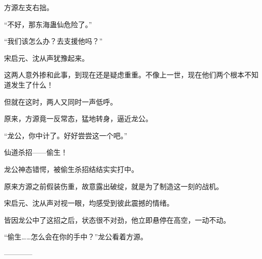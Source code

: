 \begin{this_body}
方源左支右拙。

“不好，那东海蛊仙危险了。”

“我们该怎么办？去支援他吗？”

宋启元、沈从声犹豫起来。

这两人意外掺和此事，到现在还是疑虑重重。不像上一世，现在他们两个根本不知道发生了什么！

但就在这时，两人又同时一声低呼。

原来，方源竟一反常态，猛地转身，逼近龙公。

“龙公，你中计了。好好尝尝这一个吧。”

仙道杀招——偷生！

龙公神态错愕，被偷生杀招结结实实打中。

原来方源之前假装伤重，故意露出破绽，就是为了制造这一刻的战机。

宋启元、沈从声对视一眼，均感受到彼此震撼的情绪。

皆因龙公中了这招之后，状态很不对劲，他立即悬停在高空，一动不动。

“偷生……怎么会在你的手中？”龙公看着方源。

------------

\end{this_body}

